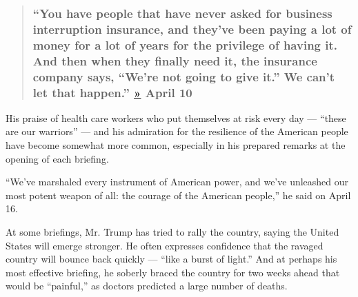 \begin{quote}
\hypertarget{you-have-people-that-have-never-asked-for-business-interruption-insurance-and-theyve-been-paying-a-lot-of-money-for-a-lot-of-years-for-the-privilege-of-having-it-and-then-when-they-finally-need-it-the-insurance-company-says-were-not-going-to-give-it-we-cant-let-that-happen--april-10}{%
\subsubsection{\texorpdfstring{``You have people that have never asked
for business interruption insurance, and they've been paying a lot of
money for a lot of years for the privilege of having it. And then when
they finally need it, the insurance company says, ``We're not going to
give it.'' We can't let that happen.''
\href{https://www.whitehouse.gov/briefings-statements/remarks-president-trump-vice-president-pence-members-coronavirus-task-force-press-briefing-24/}{»}
\textbf{April
10}}{``You have people that have never asked for business interruption insurance, and they've been paying a lot of money for a lot of years for the privilege of having it. And then when they finally need it, the insurance company says, ``We're not going to give it.'' We can't let that happen.'' » April 10}}\label{you-have-people-that-have-never-asked-for-business-interruption-insurance-and-theyve-been-paying-a-lot-of-money-for-a-lot-of-years-for-the-privilege-of-having-it-and-then-when-they-finally-need-it-the-insurance-company-says-were-not-going-to-give-it-we-cant-let-that-happen--april-10}}
\end{quote}

His praise of health care workers who put themselves at risk every day
--- ``these are our warriors'' --- and his admiration for the resilience
of the American people have become somewhat more common, especially in
his prepared remarks at the opening of each briefing.

``We've marshaled every instrument of American power, and we've
unleashed our most potent weapon of all: the courage of the American
people,'' he said on April 16.

At some briefings, Mr. Trump has tried to rally the country, saying the
United States will emerge stronger. He often expresses confidence that
the ravaged country will bounce back quickly --- ``like a burst of
light.'' And at perhaps his most effective briefing, he soberly braced
the country for two weeks ahead that would be ``painful,'' as doctors
predicted a large number of deaths.

